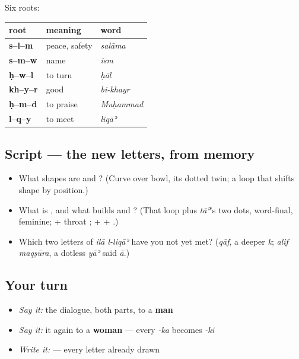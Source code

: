\begin{culture}
Six roots:

\noindent
\begin{tabularx}{\linewidth}{@{}>{\raggedright\arraybackslash}X>{\raggedright\arraybackslash}X>{\raggedright\arraybackslash}X@{}}
\toprule
\textbf{root} & \textbf{meaning} & \textbf{word} \\
\midrule
\textbf{s–l–m} & peace, safety & \emph{salāma} \\
\textbf{s–m–w} & name & \emph{ism} \\
\textbf{ḥ–w–l} & to turn & \emph{ḥāl} \\
\textbf{kh–y–r} & good & \emph{bi-khayr} \\
\textbf{ḥ–m–d} & to praise & \emph{Muḥammad} \\
\textbf{l–q–y} & to meet & \emph{liqāʾ} \\
\bottomrule
\end{tabularx}
\end{culture}

\subsection*{Script — the new letters, from memory}
\begin{itemize}
\raggedright
  \item What shapes are \textbf{} and \textbf{}? (Curve over bowl, \textbf{} its dotted twin; a loop that shifts shape by position.)
  \item What is \textbf{}, and what builds \textbf{} and \textbf{}? (That loop plus \emph{tāʾ}'s two dots, word-final, feminine; \textbf{} + throat \textbf{}; \textbf{} + \textbf{} + \textbf{}.)
  \item Which two letters of \emph{ilā l-liqāʾ} have you not yet met? (\emph{qāf}, a deeper \emph{k}; \emph{alif maqṣūra}, a dotless \emph{yāʾ} said \emph{ā}.)
\end{itemize}

\subsection*{Your turn}
\begin{itemize}
\raggedright
  \item \emph{Say it:} the dialogue, both parts, to a \textbf{man}
  \item \emph{Say it:} it again to a \textbf{woman} — every \emph{-ka} becomes \emph{-ki}
  \item \emph{Write it:} \textbf{ } — every letter already drawn
\end{itemize}

